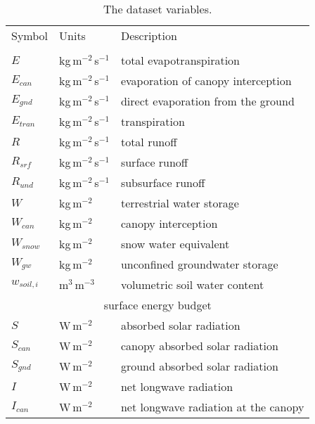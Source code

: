 \begin{table}[t]
    \caption{The dataset variables.}
    \label{tbl:variables}
    \centering
    \begin{tabular}{lll}
        \tophline
        Symbol         & Units                  & Description \\
        \middlehline
        \multicolumn{3}{c}{surface water budget}                                            \\
        \(E\)          & kg\,m$^{-2}$\,s$^{-1}$ & total evapotranspiration \\
        \(E_{can}\)    & kg\,m$^{-2}$\,s$^{-1}$ & evaporation of canopy interception \\
        \(E_{gnd}\)    & kg\,m$^{-2}$\,s$^{-1}$ & direct evaporation from the ground \\
        \(E_{tran}\)   & kg\,m$^{-2}$\,s$^{-1}$ & transpiration \\
        \(R\)          & kg\,m$^{-2}$\,s$^{-1}$ & total runoff \\
        \(R_{srf}\)    & kg\,m$^{-2}$\,s$^{-1}$ & surface runoff \\
        \(R_{und}\)    & kg\,m$^{-2}$\,s$^{-1}$ & subsurface runoff \\
        \(W\)          & kg\,m$^{-2}$           & terrestrial water storage \\
        \(W_{can}\)    & kg\,m$^{-2}$           & canopy interception \\
        \(W_{snow}\)   & kg\,m$^{-2}$           & snow water equivalent \\
        \(W_{gw}\)     & kg\,m$^{-2}$           & unconfined groundwater storage \\
        \(w_{soil,i}\) & m$^{3}$\,m$^{-3}$      & volumetric soil water content \\
        [1mm]
        \multicolumn{3}{c}{surface energy budget}                                           \\
        \(S\)          & W\,m$^{-2}$            & absorbed solar radiation \\
        \(S_{can}\)    & W\,m$^{-2}$            & canopy absorbed solar radiation \\
        \(S_{gnd}\)    & W\,m$^{-2}$            & ground absorbed solar radiation \\
        \(I\)          & W\,m$^{-2}$            & net longwave radiation \\
        \(I_{can}\)    & W\,m$^{-2}$            & net longwave radiation at the canopy \\

\end{tabular}
\end{table}

